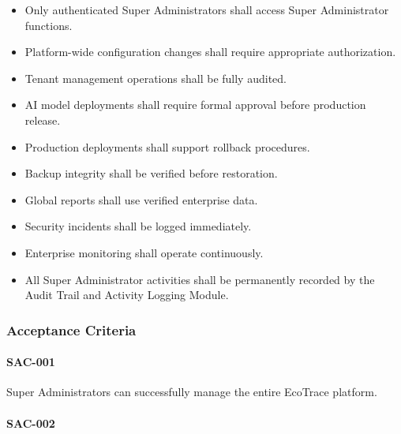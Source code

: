 \begin{itemize}

\item Only authenticated Super Administrators shall access Super
Administrator functions.

\item Platform-wide configuration changes shall require appropriate
authorization.

\item Tenant management operations shall be fully audited.

\item AI model deployments shall require formal approval before
production release.

\item Production deployments shall support rollback procedures.

\item Backup integrity shall be verified before restoration.

\item Global reports shall use verified enterprise data.

\item Security incidents shall be logged immediately.

\item Enterprise monitoring shall operate continuously.

\item All Super Administrator activities shall be permanently recorded
by the Audit Trail and Activity Logging Module.

\end{itemize}


\subsubsection*{Acceptance Criteria}

\paragraph{SAC-001}

Super Administrators can successfully manage the entire EcoTrace
platform.

\paragraph{SAC-002}

